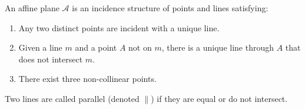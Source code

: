 An affine plane $\mathcal{A}$ is an incidence structure of points and lines satisfying:
\begin{enumerate}
\item[(i)] Any two distinct points are incident with a unique line.
\item[(ii)] Given a line $m$ and a point $A$ not on $m$, there is a unique line through $A$ that does not intersect $m$.
\item[(iii)] There exist three non-collinear points.
\end{enumerate}
Two lines are called parallel (denoted $\parallel$) if they are equal or do not intersect.
